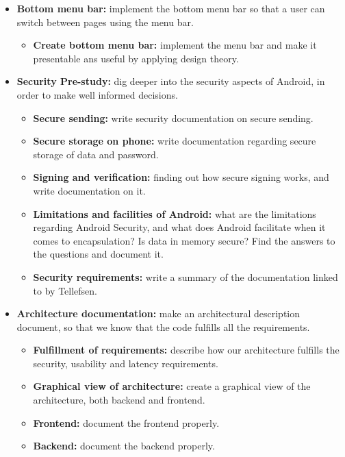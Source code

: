 \begin{itemize}
\begin{itemize}
\end{itemize}
\item{}\textbf{Bottom menu bar:} implement the bottom menu bar so that a user can switch between pages using the menu bar.
\begin{itemize}
\item{}\textbf{Create bottom menu bar:} implement the menu bar and make it presentable ans useful by applying design theory.
\end{itemize}
\item{}\textbf{Security Pre-study:} dig deeper into the security aspects of Android, in order to make well informed decisions.
\begin{itemize}
\item{}\textbf{Secure sending:} write security documentation on secure sending.
\item{}\textbf{Secure storage on phone:} write documentation regarding secure storage of data and password.
\item{}\textbf{Signing and verification:} finding out how secure signing works, and write documentation on it.
\item{}\textbf{Limitations and facilities of Android:} what are the limitations regarding Android Security, and what does Android facilitate when it comes to encapsulation? Is data in memory secure? Find the answers to the questions and document it.
\item{}\textbf{Security requirements:} write a summary of the documentation linked to by Tellefsen.
\end{itemize}
\item{}\textbf{Architecture documentation:} make an architectural description document, so that we know that the code fulfills all the requirements.
\begin{itemize}
\item{}\textbf{Fulfillment of requirements:} describe how our architecture fulfills the security, usability and latency requirements.
\item{}\textbf{Graphical view of architecture:} create a graphical view of the architecture, both backend and frontend.
\item{}\textbf{Frontend:} document the frontend properly.
\item{}\textbf{Backend:} document the backend properly.
\end{itemize}
\end{itemize}
